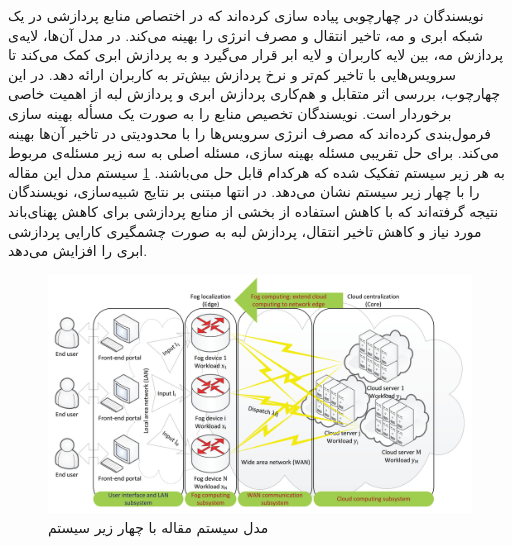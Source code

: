     نویسندگان در \cite{deng2016optimal} چهارچوبی پیاده سازی کرده‌اند که در اختصاص منابع پردازشی در یک شبکه ابری و مه، تاخیر انتقال و مصرف انرژی را بهینه می‌کند.
    در مدل آن‌ها، لایه‌ی پردازش مه، بین لایه کاربران و لایه‌ ابر قرار می‌گیرد و به پردازش ابری کمک می‌کند تا سرویس‌هایی با تاخیر کم‌تر و نرخ پردازش بیش‌تر به کاربران ارائه دهد.
    در این چهارچوب، بررسی اثر متقابل و هم‌کاری پردازش ابری و پردازش لبه از اهمیت خاصی برخوردار است.
    نویسندگان تخصیص منابع را به صورت یک مسأله بهینه سازی فرمول‌بندی کرده‌اند که مصرف انرژی سرویس‌ها را با محدودیتی در تاخیر آن‌ها بهینه می‌کند.
    برای حل تقریبی مسئله بهینه سازی، مسئله اصلی به سه زیر مسئله‌ی مربوط به هر زیر سیستم تفکیک شده که هرکدام قابل حل می‌باشند.
    \cref{fig:chapter_2:system_model_deng2016optimal} سیستم مدل این مقاله را با چهار زیر سیستم نشان می‌دهد.
    در انتها مبتنی بر نتایج شبیه‌سازی، نویسندگان نتیجه گرفته‌اند که با کاهش استفاده از بخشی از منابع پردازشی برای کاهش پهنای‌باند مورد نیاز و کاهش تاخیر انتقال، پردازش لبه به صورت چشمگیری کارایی پردازشی ابری را افزایش می‌دهد.

    \begin{figure}[h]
      \centerline{\includegraphics[width=15cm]{graphics/chapter_2/system_model_deng2016optimal}}
      \caption{مدل سیستم مقاله \cite{deng2016optimal} با چهار زیر سیستم}
      \label{fig:chapter_2:system_model_deng2016optimal}
    \end{figure}


